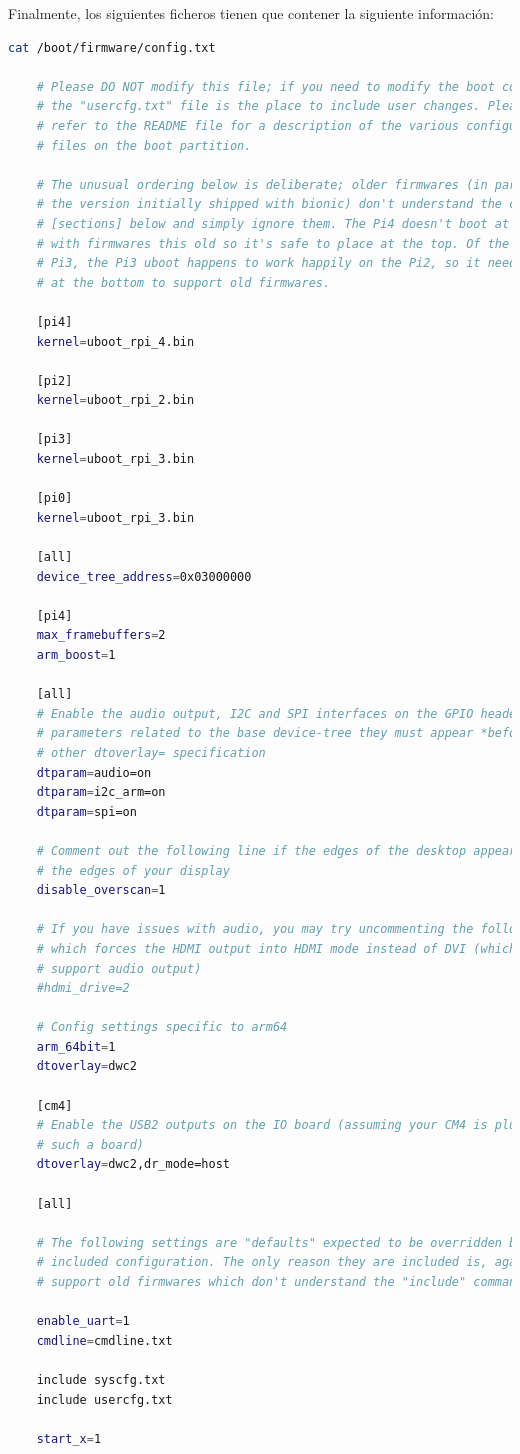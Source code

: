 Finalmente, los siguientes ficheros tienen que contener la siguiente información: 

\begin{lstlisting}[language=bash]
	cat /boot/firmware/config.txt 
	
	# Please DO NOT modify this file; if you need to modify the boot config,
	# the "usercfg.txt" file is the place to include user changes. Please 
	# refer to the README file for a description of the various configuration 
	# files on the boot partition.
	
	# The unusual ordering below is deliberate; older firmwares (in particular 
	# the version initially shipped with bionic) don't understand the conditional
	# [sections] below and simply ignore them. The Pi4 doesn't boot at all 
	# with firmwares this old so it's safe to place at the top. Of the Pi2 and 
	# Pi3, the Pi3 uboot happens to work happily on the Pi2, so it needs to go 
	# at the bottom to support old firmwares.
	
	[pi4]
	kernel=uboot_rpi_4.bin
	
	[pi2]
	kernel=uboot_rpi_2.bin
	
	[pi3]
	kernel=uboot_rpi_3.bin
	
	[pi0]
	kernel=uboot_rpi_3.bin
	
	[all]
	device_tree_address=0x03000000
	
	[pi4]
	max_framebuffers=2
	arm_boost=1
	
	[all]
	# Enable the audio output, I2C and SPI interfaces on the GPIO header. As these
	# parameters related to the base device-tree they must appear *before* any
	# other dtoverlay= specification
	dtparam=audio=on
	dtparam=i2c_arm=on
	dtparam=spi=on
	
	# Comment out the following line if the edges of the desktop appear outside
	# the edges of your display
	disable_overscan=1
	
	# If you have issues with audio, you may try uncommenting the following line
	# which forces the HDMI output into HDMI mode instead of DVI (which doesn't
	# support audio output)
	#hdmi_drive=2
	
	# Config settings specific to arm64
	arm_64bit=1
	dtoverlay=dwc2
	
	[cm4]
	# Enable the USB2 outputs on the IO board (assuming your CM4 is plugged into
	# such a board)
	dtoverlay=dwc2,dr_mode=host
	
	[all]
	
	# The following settings are "defaults" expected to be overridden by the
	# included configuration. The only reason they are included is, again, to
	# support old firmwares which don't understand the "include" command.
	
	enable_uart=1
	cmdline=cmdline.txt
	
	include syscfg.txt
	include usercfg.txt
	
	start_x=1
\end{lstlisting}

